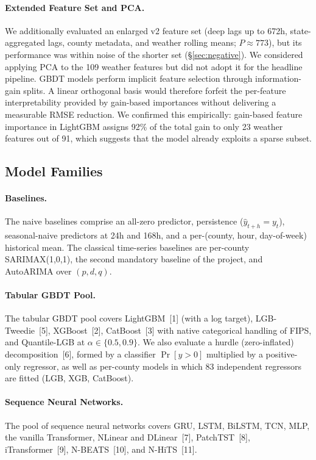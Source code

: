 \documentclass[11pt]{article}
\begin{document}
\paragraph{Extended Feature Set and PCA.}
We additionally evaluated an enlarged v2 feature set (deep lags up to 672h, state-aggregated lags, county metadata, and weather rolling means; $P\!\approx\!773$), but its performance was within noise of the shorter set (\S\ref{sec:negative}). We considered applying PCA to the 109 weather features but did not adopt it for the headline pipeline. GBDT models perform implicit feature selection through information-gain splits. A linear orthogonal basis would therefore forfeit the per-feature interpretability provided by gain-based importances without delivering a measurable RMSE reduction. We confirmed this empirically: gain-based feature importance in LightGBM assigns 92\% of the total gain to only 23 weather features out of 91, which suggests that the model already exploits a sparse subset.

\subsection{Model Families}

\paragraph{Baselines.}
The naive baselines comprise an all-zero predictor, persistence ($\hat y_{t+h}\!=\!y_t$), seasonal-naive predictors at 24h and 168h, and a per-(county, hour, day-of-week) historical mean. The classical time-series baselines are per-county SARIMAX(1,0,1), the second mandatory baseline of the project, and AutoARIMA over $(p,d,q)$. 

\paragraph{Tabular GBDT Pool.}
The tabular GBDT pool covers LightGBM~[1] (with a log target), LGB-Tweedie~[5], XGBoost~[2], CatBoost~[3] with native categorical handling of FIPS, and Quantile-LGB at $\alpha\!\in\!\{0.5,0.9\}$. We also evaluate a hurdle (zero-inflated) decomposition~[6], formed by a classifier $\Pr[y\!>\!0]$ multiplied by a positive-only regressor, as well as per-county models in which 83 independent regressors are fitted (LGB, XGB, CatBoost). 

\paragraph{Sequence Neural Networks.}
The pool of sequence neural networks covers GRU, LSTM, BiLSTM, TCN, MLP, the vanilla Transformer, NLinear and DLinear~[7], PatchTST~[8], iTransformer~[9], N-BEATS~[10], and N-HiTS~[11]. 
\end{document}

